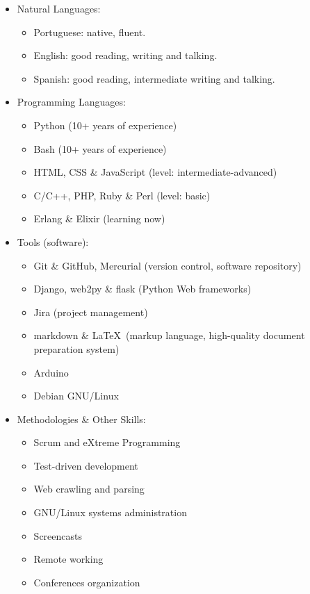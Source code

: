 \documentclass[a4paper,11pt]{article}
\begin{document}
	\begin{itemize}
		\item Natural Languages:
		\begin{itemize}
			\item Portuguese: native, fluent.
			\item English: good reading, writing and talking.
			\item Spanish: good reading, intermediate writing and talking.
		\end{itemize}
	\item Programming Languages:
		\begin{itemize}
			\item Python (10+ years of experience)
			\item Bash (10+ years of experience)
			\item HTML, CSS \& JavaScript (level: intermediate-advanced)
			\item C/C++, PHP, Ruby \& Perl (level: basic)
			\item Erlang \& Elixir (learning now)
		\end{itemize}
		\item Tools (software):
		\begin{itemize}
			\item Git \& GitHub, Mercurial (version control, software
				repository)
			\item Django, web2py \& flask (Python Web frameworks)
			\item Jira (project management)
			\item markdown \& \LaTeX\ (markup language, high-quality document
				preparation system)
			\item Arduino
			\item Debian GNU/Linux
		\end{itemize}
		\item Methodologies \& Other Skills:
		\begin{itemize}
			\item Scrum and eXtreme Programming
			\item Test-driven development
			\item Web crawling and parsing
			\item GNU/Linux systems administration
			\item Screencasts
			\item Remote working
			\item Conferences organization
		\end{itemize}
	\end{itemize}
\end{document}
